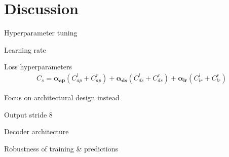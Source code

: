 \documentclass[11pt]{beamer}
\newenvironment{wideitemize}{\itemize\addtolength{\itemsep}{.75em}}{\enditemize}
\newcommand{\addsubitemspace}{\vspace{0.5em}}
\begin{document}
\section{Discussion}
\begin{frame}[c]{\secname}
    \begin{wideitemize}
        \item Hyperparameter tuning
        \addsubitemspace
        \begin{wideitemize}
        \item Learning rate
        \item Loss hyperparameters
        \begin{align*}
            C_s = \boldsymbol{\alpha_{ap}}\left(C^l_{ap} + C^r_{ap}\right) + \boldsymbol{\alpha_{ds}}\left(C^l_{ds} + C^r_{ds}\right) + \boldsymbol{\alpha_{lr}}\left(C^l_{lr} + C^r_{lr}\right)
        \end{align*}
        
        \item Focus on architectural design instead
        \end{wideitemize}
    \end{wideitemize}
\end{frame}
\begin{frame}[c]{\secname}
\begin{wideitemize}
        \item Output stride 8
        \item Decoder architecture
        \item Robustness of training \& predictions
\end{wideitemize}

\end{frame}
\end{document}
